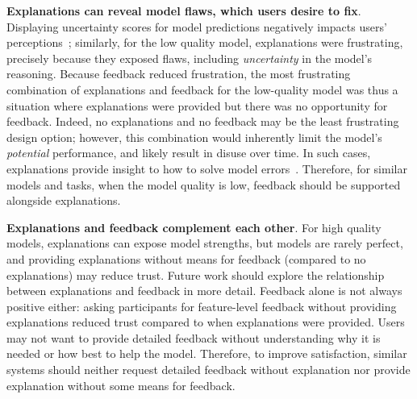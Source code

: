 \textbf{Explanations can reveal model flaws, which users desire to fix}. 
Displaying uncertainty scores for model predictions negatively impacts users' perceptions~\cite{Lim2011InvestigatingApplications}; similarly, for the low quality model, explanations were frustrating, precisely because they exposed flaws, including \textit{uncertainty} in the model's reasoning.
Because feedback reduced frustration, the most frustrating combination of explanations and feedback for the low-quality model was thus a situation where explanations were provided but there was no opportunity for feedback. Indeed, no explanations and no feedback may be the least frustrating design option; however, this combination would inherently limit the model's \textit{potential} performance, and likely result in disuse over time.
In such cases, explanations provide insight to how to solve model errors~\cite{Kulesza2015PrinciplesLearning}. Therefore, for similar models and tasks, when the model quality is low, feedback should be supported alongside explanations.

\textbf{Explanations and feedback complement each other}.
%
For high quality models, explanations can expose model strengths, but models are rarely perfect, and providing explanations without means for feedback (compared to no explanations) may reduce trust. Future work should explore the relationship between explanations and feedback in more detail. 
Feedback alone is not always positive either: asking participants for feature-level feedback without providing explanations reduced trust compared to when explanations were provided. Users may not want to provide detailed feedback without understanding why it is needed or how best to help the model. 
%
Therefore, to improve satisfaction, similar systems should neither request detailed feedback without explanation nor provide explanation without some means for feedback.

